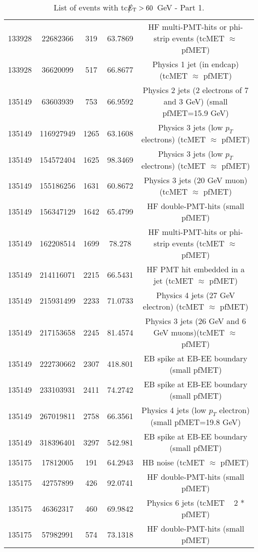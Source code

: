 \begin{table}[htbp]
\begin{center}
\begin{tabular}{|c|c|c|c|c|}
      133928 & 22682366    & 319  &    63.7869  & HF multi-PMT-hits or phi-strip events (tcMET $\approx$ pfMET) \\
      133928 & 36620099    & 517  &    66.8677  & Physics 1 jet (in endcap) (tcMET $\approx$ pfMET) \\
      135149 & 63603939    & 753  &    66.9592  & Physics 2 jets (2 electrons of 7 and 3 GeV) (small pfMET=15.9 GeV) \\
      135149 & 116927949   & 1265 &    63.1608  & Physics 3 jets (low $p_T$ electrons) (tcMET $\approx$ pfMET) \\
      135149 & 154572404   & 1625 &    98.3469  & Physics 3 jets (low $p_T$ electrons) (tcMET $\approx$ pfMET) \\
      135149 & 155186256   & 1631 &    60.8672  & Physics 3 jets (20 GeV muon) (tcMET $\approx$ pfMET) \\
      135149 & 156347129   & 1642 &    65.4799  & HF double-PMT-hits (small pfMET) \\
      135149 & 162208514   & 1699 &    78.278   & HF multi-PMT-hits or phi-strip events (tcMET $\approx$ pfMET) \\ 
      135149 & 214116071   & 2215 &    66.5431  & HF PMT hit embedded in a jet (tcMET $\approx$ pfMET) \\
      135149 & 215931499   & 2233 &    71.0733  & Physics 4 jets (27 GeV electron) (tcMET $\approx$ pfMET) \\
      135149 & 217153658   & 2245 &    81.4574  & Physics 3 jets (26 GeV and 6 GeV muons)(tcMET $\approx$ pfMET) \\
      135149 & 222730662   & 2307 &    418.801  & EB spike at EB-EE boundary (small pfMET) \\ 
      135149 & 233103931   & 2411 &    74.2742  & EB spike at EB-EE boundary (small pfMET) \\ 
      135149 & 267019811   & 2758 &    66.3561  & Physics 4 jets (low $p_T$ electron)(small pfMET=19.8 GeV) \\
      135149 & 318396401   & 3297 &    542.981  & EB spike at EB-EE boundary (small pfMET) \\
      135175  & 17812005     & 191  &    64.2943 & HB noise (tcMET $\approx$ pfMET) \\
      135175  & 42757899     & 426  &    92.0741 & HF double-PMT-hits (small pfMET) \\
      135175  & 46362317     & 460  &    69.9842 & Physics 6 jets (tcMET ~ 2 * pfMET) \\
      135175  & 57982991     & 574  &    73.1318 & HF double-PMT-hits (small pfMET) \\
      \hline
    \end{tabular}
    \caption{List of events with tc$\big\slash\hspace{-1.6ex}{E_\text{T}}>60$~GeV - Part 1.}        
    \label{tab:tcMETlist1}
  \end{center}
\end{table}


